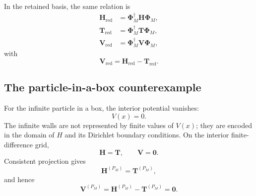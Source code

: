 In the retained basis, the same relation is
\begin{align}
    \mathbf H_{\mathrm{red}}
    &=
    \boldsymbol\Phi_M^\dagger
    \mathbf H
    \boldsymbol\Phi_M,
    \\
    \mathbf T_{\mathrm{red}}
    &=
    \boldsymbol\Phi_M^\dagger
    \mathbf T
    \boldsymbol\Phi_M,
    \\
    \mathbf V_{\mathrm{red}}
    &=
    \boldsymbol\Phi_M^\dagger
    \mathbf V
    \boldsymbol\Phi_M,
\end{align}
with
\begin{equation}
    \mathbf V_{\mathrm{red}}
    =
    \mathbf H_{\mathrm{red}}-\mathbf T_{\mathrm{red}}.
\end{equation}

\subsection{The particle-in-a-box counterexample}

For the infinite particle in a box, the interior potential vanishes:
\begin{equation}
    V(x)=0.
\end{equation}
The infinite walls are not represented by finite values of $V(x)$; they are
encoded in the domain of $\hat H$ and its Dirichlet boundary conditions. On
the interior finite-difference grid,
\begin{equation}
    \mathbf H=\mathbf T,
    \qquad
    \mathbf V=\mathbf 0.
\end{equation}
Consistent projection gives
\begin{equation}
    \mathbf H^{(P_M)}
    =
    \mathbf T^{(P_M)},
\end{equation}
and hence
\begin{equation}
    \mathbf V^{(P_M)}
    =
    \mathbf H^{(P_M)}-\mathbf T^{(P_M)}
    =
    \mathbf 0.
\end{equation}

